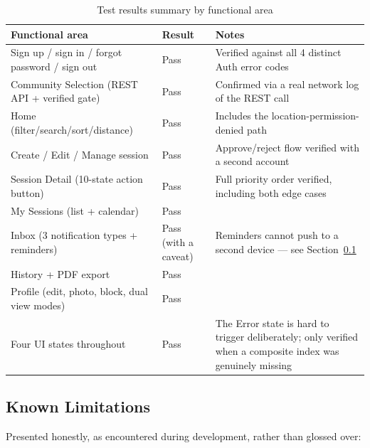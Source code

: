 \begin{table}[h]
\centering
\caption{Test results summary by functional area}
\label{tab:testresult}
\begin{tabular}{p{5.5cm}p{2cm}p{5cm}}
\toprule
\textbf{Functional area} & \textbf{Result} & \textbf{Notes} \\
\midrule
Sign up / sign in / forgot password / sign out & Pass & Verified against all 4 distinct Auth error codes \\
Community Selection (REST API + verified gate) & Pass & Confirmed via a real network log of the REST call \\
Home (filter/search/sort/distance) & Pass & Includes the location-permission-denied path \\
Create / Edit / Manage session & Pass & Approve/reject flow verified with a second account \\
Session Detail (10-state action button) & Pass & Full priority order verified, including both edge cases \\
My Sessions (list + calendar) & Pass & \\
Inbox (3 notification types + reminders) & Pass (with a caveat) & Reminders cannot push to a second device — see Section~\ref{sec:limitations} \\
History + PDF export & Pass & \\
Profile (edit, photo, block, dual view modes) & Pass & \\
Four UI states throughout & Pass & The Error state is hard to trigger deliberately; only verified when a composite index was genuinely missing \\
\bottomrule
\end{tabular}
\end{table}

\subsection{Known Limitations}
\label{sec:limitations}

Presented honestly, as encountered during development, rather than glossed over:


